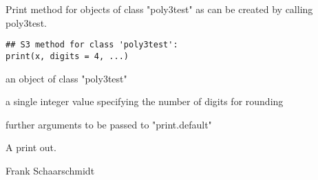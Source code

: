 \begin{Description}\relax
Print method for objects of class "poly3test" as can be created by calling poly3test.
\end{Description}
\begin{Usage}
\begin{verbatim}
## S3 method for class 'poly3test':
print(x, digits = 4, ...)
\end{verbatim}
\end{Usage}
\begin{Arguments}
\begin{ldescription}
\item[\code{x}] an object of class "poly3test" 
\item[\code{digits}] a single integer value specifying the number of digits for rounding 
\item[\code{...}] further arguments to be passed to "print.default" 
\end{ldescription}
\end{Arguments}
\begin{Value}
A print out.
\end{Value}
\begin{Author}\relax
Frank Schaarschmidt
\end{Author}

